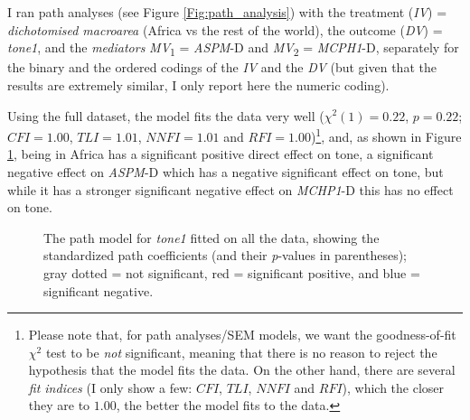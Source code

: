 \documentclass[twoside,onecolumn]{article}
\begin{document}
I ran path analyses (see Figure \ref{Fig:path_analysis}) with the treatment (\textit{IV}) = \textit{dichotomised macroarea} (Africa vs the rest of the world), the outcome (\textit{DV}) = \textit{tone1}, and the \textit{mediators} \textit{MV}\textsubscript{1} = \textit{ASPM}-D and \textit{MV}\textsubscript{2} = \textit{MCPH1}-D, separately for the binary and the ordered codings of the \textit{IV} and the \textit{DV} (but given that the results are extremely similar, I only report here the numeric coding).

Using the full dataset, the model fits the data very well ($\chi^2(1) = 0.22$, $p = 0.22$; $CFI=1.00$, $TLI=1.01$, $NNFI=1.01$ and $RFI=1.00$)\footnote{Please note that, for path analyses/SEM models, we want the goodness-of-fit $\chi^2$ test to be \emph{not} significant, meaning that there is no reason to reject the hypothesis that the model fits the data. On the other hand, there are several \emph{fit indices} (I only show a few: $CFI$, $TLI$, $NNFI$ and $RFI$), which the closer they are to $1.00$, the better the model fits to the data.}, and, as shown in Figure \ref{Fig:tone1_path_all}, being in Africa has a significant positive direct effect on tone, a significant negative effect on \textit{ASPM}-D which has a negative significant effect on tone, but while it has a stronger significant negative effect on \textit{MCHP1}-D this has no effect on tone.

\begin{figure}[h]
  \centering


  \caption{The path model for \textit{tone1} fitted on all the data, showing the standardized path coefficients (and their \textit{p}-values in parentheses); gray dotted = not significant, red = significant positive, and blue = significant negative. }
  \label{Fig:tone1_path_all}
\end{figure}
\end{document}
